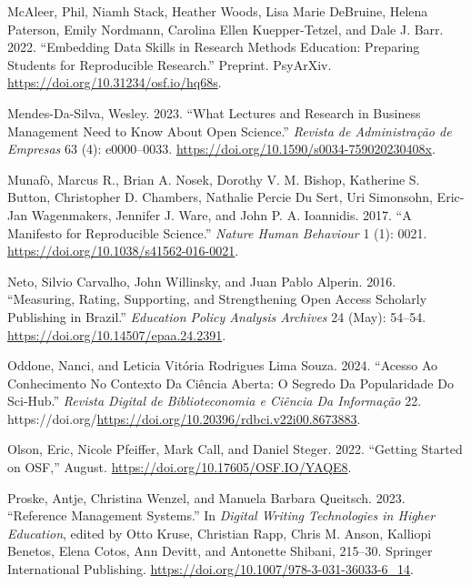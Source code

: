 \documentclass[
  a4paper,
]{article}
\newlength{\cslhangindent}
\newenvironment{CSLReferences}[2] %
 {\begin{list}{}{%
  \setlength{\itemindent}{0pt}
  \setlength{\leftmargin}{0pt}
  \setlength{\parsep}{0pt}
  \ifodd #1
   \setlength{\leftmargin}{\cslhangindent}
   \setlength{\itemindent}{-1\cslhangindent}
  \fi
  \setlength{\itemsep}{#2\baselineskip}}}
 {\end{list}}
\begin{document}
\begin{CSLReferences}{1}{0}
McAleer, Phil, Niamh Stack, Heather Woods, Lisa Marie DeBruine, Helena
Paterson, Emily Nordmann, Carolina Ellen Kuepper-Tetzel, and Dale J.
Barr. 2022. {``Embedding {Data Skills} in {Research Methods Education}:
{Preparing Students} for {Reproducible Research}.''} Preprint. PsyArXiv.
\url{https://doi.org/10.31234/osf.io/hq68s}.

Mendes-Da-Silva, Wesley. 2023. {``What {Lectures} and {Research} in
{Business Management Need} to {Know About Open Science}.''}
\emph{Revista de Administra{ç}{ã}o de Empresas} 63 (4): e0000--0033.
\url{https://doi.org/10.1590/s0034-759020230408x}.

Munafò, Marcus R., Brian A. Nosek, Dorothy V. M. Bishop, Katherine S.
Button, Christopher D. Chambers, Nathalie Percie Du Sert, Uri Simonsohn,
Eric-Jan Wagenmakers, Jennifer J. Ware, and John P. A. Ioannidis. 2017.
{``A Manifesto for Reproducible Science.''} \emph{Nature Human
Behaviour} 1 (1): 0021. \url{https://doi.org/10.1038/s41562-016-0021}.

Neto, Silvio Carvalho, John Willinsky, and Juan Pablo Alperin. 2016.
{``Measuring, Rating, Supporting, and Strengthening Open Access
Scholarly Publishing in {Brazil}.''} \emph{Education Policy Analysis
Archives} 24 (May): 54--54. \url{https://doi.org/10.14507/epaa.24.2391}.

Oddone, Nanci, and Leticia Vitória Rodrigues Lima Souza. 2024. {``Acesso
Ao Conhecimento No Contexto Da Ciência Aberta: O Segredo Da Popularidade
Do Sci-Hub.''} \emph{Revista Digital de Biblioteconomia e Ciência Da
Informação} 22.
https://doi.org/\url{https://doi.org/10.20396/rdbci.v22i00.8673883}.

Olson, Eric, Nicole Pfeiffer, Mark Call, and Daniel Steger. 2022.
{``Getting Started on OSF,''} August.
\url{https://doi.org/10.17605/OSF.IO/YAQE8}.

Proske, Antje, Christina Wenzel, and Manuela Barbara Queitsch. 2023.
{``Reference Management Systems.''} In \emph{Digital Writing
Technologies in Higher Education}, edited by Otto Kruse, Christian Rapp,
Chris M. Anson, Kalliopi Benetos, Elena Cotos, Ann Devitt, and Antonette
Shibani, 215--30. Springer International Publishing.
\url{https://doi.org/10.1007/978-3-031-36033-6_14}.


\end{CSLReferences}
\end{document}

